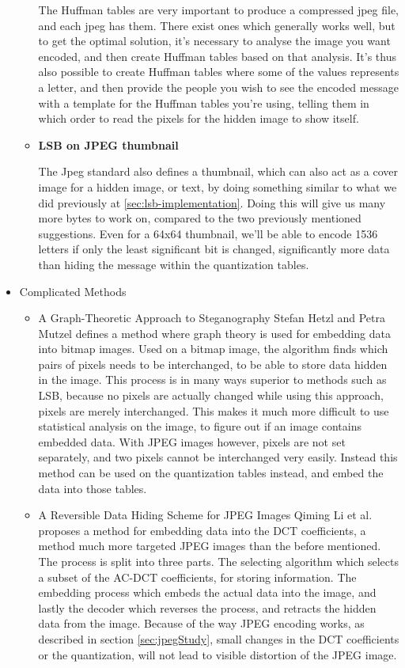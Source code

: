 \begin{itemize}
\begin{itemize}
		The Huffman tables are very important to produce a compressed jpeg file, and each jpeg has them.
		There exist ones which generally works well, but to get the optimal solution, it's necessary to analyse the image you want encoded, and then create Huffman tables based on that analysis.
		It's thus also possible to create Huffman tables where some of the values represents a letter, and then provide the people you wish to see the encoded message with a template for the Huffman tables you're using, telling them in which order to read the pixels for the hidden image to show itself.
		\item \textbf{LSB on JPEG thumbnail}

		The Jpeg standard also defines a thumbnail, which can also act as a cover image for a hidden image, or text, by doing something similar to what we did previously at \ref{sec:lsb-implementation}.
		Doing this will give us many more bytes to work on, compared to the two previously mentioned suggestions.
		Even for a 64x64 thumbnail, we'll be able to encode 1536 letters if only the least significant bit is changed, significantly more data than hiding the message within the quantization tables.
	\end{itemize}
	\item Complicated Methods
	\begin{itemize}
		\item A Graph-Theoretic Approach to Steganography
		Stefan Hetzl and Petra Mutzel defines a method where graph theory is used for embedding data into bitmap images\citep{hetzl_2005}. Used on a bitmap image, the algorithm finds which pairs of pixels needs to be interchanged, to be able to store data hidden in the image. This process is in many ways superior to methods such as LSB, because no pixels are actually changed while using this approach, pixels are merely interchanged. This makes it much more difficult to use statistical analysis on the image, to figure out if an image contains embedded data. With JPEG images however, pixels are not set separately, and two pixels cannot be interchanged very easily. Instead this method can be used on the quantization tables instead, and embed the data into those tables.  

		\item A Reversible Data Hiding Scheme for JPEG Images
		Qiming Li et al. proposes a method for embedding data into the DCT coefficients\citep{Li2010}, a method much more targeted JPEG images than the before mentioned. The process is split into three parts. The selecting algorithm which selects a subset of the AC-DCT coefficients, for storing information. The embedding process which embeds the actual data into the image, and lastly the decoder which reverses the process, and retracts the hidden data from the image. Because of the way JPEG encoding works, as described in section \ref{sec:jpegStudy}, small changes in the DCT coefficients or the quantization, will not lead to visible distortion of the JPEG image.

	\end{itemize}
\end{itemize}
